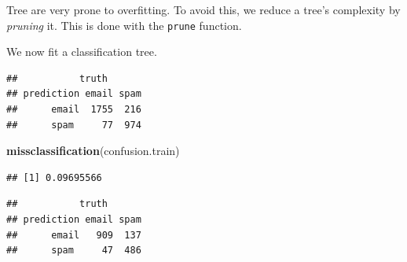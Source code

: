 \documentclass[]{book}
\newenvironment{Shaded}{\begin{snugshade}}{\end{snugshade}}
\newcommand{\KeywordTok}[1]{\textcolor[rgb]{0.13,0.29,0.53}{\textbf{{#1}}}}
\newcommand{\DataTypeTok}[1]{\textcolor[rgb]{0.13,0.29,0.53}{{#1}}}
\newcommand{\FloatTok}[1]{\textcolor[rgb]{0.00,0.00,0.81}{{#1}}}
\newcommand{\StringTok}[1]{\textcolor[rgb]{0.31,0.60,0.02}{{#1}}}
\newcommand{\CommentTok}[1]{\textcolor[rgb]{0.56,0.35,0.01}{\textit{{#1}}}}
\newcommand{\NormalTok}[1]{{#1}}
\theoremstyle{definition}
\theoremstyle{definition}
\theoremstyle{remark}
\begin{document}
Tree are very prone to overfitting. To avoid this, we reduce a tree's
complexity by \emph{pruning} it. This is done with the \texttt{prune}
function.

We now fit a classification tree.

\begin{Shaded}
\end{Shaded}

\begin{verbatim}
##           truth
## prediction email spam
##      email  1755  216
##      spam     77  974
\end{verbatim}

\begin{Shaded}
\begin{Highlighting}[]
\KeywordTok{missclassification}\NormalTok{(confusion.train)}
\end{Highlighting}
\end{Shaded}

\begin{verbatim}
## [1] 0.09695566
\end{verbatim}

\begin{Shaded}
\end{Shaded}

\begin{verbatim}
##           truth
## prediction email spam
##      email   909  137
##      spam     47  486
\end{verbatim}
\end{document}
